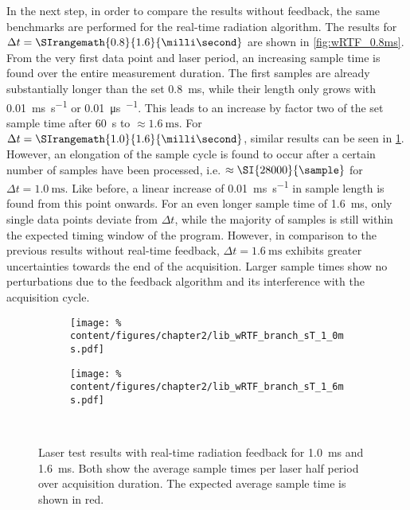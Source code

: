             In the next step, in order to compare the results without feedback, the same benchmarks are performed for the real-time radiation algorithm. The results for $\Delta t=\SIrangemath{0.8}{1.6}{\milli\second}$ are shown in \cref{fig:wRTF_0.8ms}. From the very first data point and laser period, an increasing sample time is found over the entire measurement duration. The first samples are already substantially longer than the set \SI{0.8}{\milli\second}, while their length only grows with \SI{0.01}{\milli\second\per\second} or \SI{0.01}{\micro\second\per\sample}. This leads to an increase by factor two of the set sample time after \SI{60}{\second} to $\approx\SI{1.6}{\milli\second}$. For $\Delta t=\SIrangemath{1.0}{1.6}{\milli\second}$, similar results can be seen in \cref{fig:wRTF_1.0_1.6ms}. However, an elongation of the sample cycle is found to occur after a certain number of samples have been processed, i.e. $\approx\SI{28000}{\sample}$ for $\Delta t=\SI{1.0}{\milli\second}$. Like before, a linear increase of \SI{0.01}{\milli\second\per\second} in sample length is found from this point onwards. For an even longer sample time of \SI{1.6}{\milli\second}, only single data points deviate from $\Delta t$, while the majority of samples is still within the expected timing window of the program. However, in comparison to the previous results without real-time feedback, $\Delta t=\SI{1.6}{\milli\second}$ exhibits greater uncertainties towards the end of the acquisition. Larger sample times show no perturbations due to the feedback algorithm and its interference with the acquisition cycle.\\%
%
            \begin{figure}[t]%
                \centering%
                \begin{subfigure}{0.48\textwidth}%
                    \texttt{[image: \%
                        content/figures/chapter2/lib\_wRTF\_branch\_sT\_1\_0ms.pdf]}%
                \end{subfigure}%
                \hspace*{0.25cm}%
                \begin{subfigure}{0.48\textwidth}%
                    \texttt{[image: \%
                        content/figures/chapter2/lib\_wRTF\_branch\_sT\_1\_6ms.pdf]}%
                \end{subfigure}\\%
                \caption{Laser test results with real-time radiation feedback for \SI{1.0}{\milli\second} and \SI{1.6}{\milli\second}. Both show the average sample times per laser half period over acquisition duration. The expected average sample time is shown in red.}\label{fig:wRTF_1.0_1.6ms}%
            \end{figure}%
